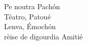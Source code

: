 \newpage 

\clearpage
\begin{center}
\thispagestyle{empty}
\vspace*{\fill}
\Large
\ECFJD
Pe noutra Pach\'on\\
Téatro, Patoué\\
Lenva, \'Emoch\'on\\
rèise de digourdia Amitié
\vspace*{\fill}
\end{center}
\newpage


